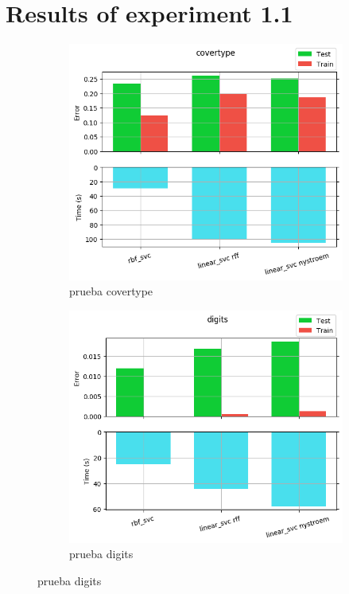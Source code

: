 
\chapter{Results of experiment 1.1} %

\label{Appendix1-1} %


\begin{figure}[ht]
  \centering
  \begin{subfigure}[b]{0.5\linewidth}
    \centering\includegraphics[width=\imgscale\linewidth]{Figures/1_1/covertype}
    \caption{prueba covertype}
    \label{fig:1_1_covertype}
  \end{subfigure}%
  \begin{subfigure}[b]{0.5\linewidth}
    \centering\includegraphics[width=\imgscale\linewidth]{Figures/1_1/digits}
    \caption{prueba digits}
    \label{fig:1_1_digits}
  \end{subfigure}
\end{figure}


